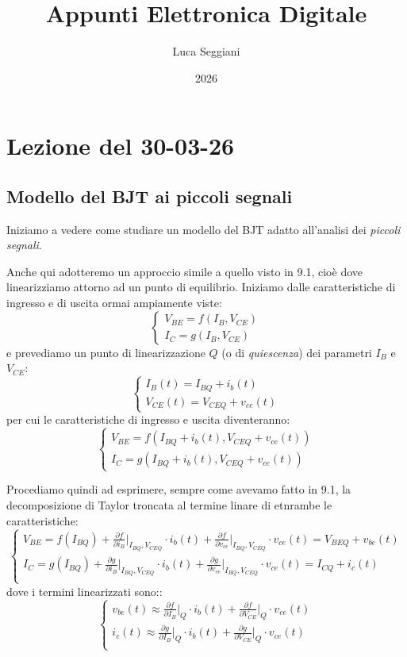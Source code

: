 \documentclass[a4paper,11pt]{article}
\title{Appunti Elettronica Digitale}
\author{Luca Seggiani}
\date{2026}
\begin{document}
\section{Lezione del 30-03-26}

\thispagestyle{empty}
\pagestyle{fancy}

\subsection{Modello del BJT ai piccoli segnali}
Iniziamo a vedere come studiare un modello del BJT adatto all'analisi dei \textit{piccoli segnali}.

Anche qui adotteremo un approccio simile a quello visto in 9.1, cioè dove linearizziamo attorno ad un punto di equilibrio. Iniziamo dalle caratteristiche di ingresso e di uscita ormai ampiamente viste:
$$
\begin{cases}
	V_{BE} = f(I_B, V_{CE}) \\
	I_C = g(I_B, V_{CE})
\end{cases}
$$
e prevediamo un punto di linearizzazione $Q$ (o di \textit{quiescenza}) dei parametri $I_B$ e $V_{CE}$:
$$
\begin{cases}
	I_B(t) = I_{BQ} + i_b (t) \\
	V_{CE}(t) = V_{CEQ} + v_{ce}(t)
\end{cases}
$$
per cui le caratteristiche di ingresso e uscita diventeranno:
$$
\begin{cases}
	V_{BE} = f(I_{BQ} + i_b(t), V_{CEQ} + v_{ce}(t)) \\
	I_C = g(I_{BQ} + i_b(t), V_{CEQ} + v_{ce}(t))
\end{cases}
$$

Procediamo quindi ad esprimere, sempre come avevamo fatto in 9.1, la decomposizione di Taylor troncata al termine linare di etnrambe le caratteristiche:
$$
\begin{cases}
	V_{BE} = f(I_{BQ}) + \frac{\partial f}{\partial i_B} \Big|_{I_{BQ}, V_{CEQ}} \cdot i_b(t) + \frac{\partial f}{\partial v_{ce}} \Big|_{I_{BQ}, V_{CEQ}} \cdot v_{ce}(t) = V_{BEQ} + v_{be}(t) \\

	I_C = g(I_{BQ}) + \frac{\partial g}{\partial i_B} \Big|_{I_{BQ}, V_{CEQ}} \cdot i_b(t) + \frac{\partial g}{\partial v_{ce}} \Big|_{I_{BQ}, V_{CEQ}} \cdot v_{ce}(t) = I_{CQ} + i_c(t) \\
\end{cases}
$$
dove i termini linearizzati sono::
$$
\begin{cases}
v_{be}(t) \approx \frac{\partial f}{\partial I_B} \Big|_Q \cdot i_b(t) + \frac{\partial f}{\partial V_{CE}} \Big|_Q \cdot v_{ce}(t) \\

i_c(t) \approx \frac{\partial g}{\partial I_B} \Big|_Q \cdot i_b(t) + \frac{\partial g}{\partial V_{CE}} \Big|_Q \cdot v_{ce}(t) \\
\end{cases}
$$
\end{document}
